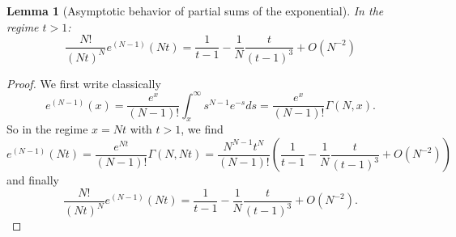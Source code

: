 \documentclass[12pt,a4paper]{amsart}
\theoremstyle{plain} %
\newtheorem{lemma}[theorem]{Lemma}
\begin{document}
\begin{lemma}[Asymptotic behavior of partial sums of the exponential]\label{lemma:asymp_partial_sums}
In the regime $t>1$: 
$$\frac{N!}{(Nt)^N} e^{(N-1)} (Nt) =  \frac{1}{t-1} - \frac{1}{N} \frac{t}{(t-1)^3} + O(N^{-2})$$
\end{lemma}

\begin{proof}
We first write classically 
$$
e^{(N-1)} (x)
= \frac{e^x}{(N-1)!} \int_{x}^{\infty} s^{N-1} e^{-s} d s
= \frac{e^x}{(N-1)!} \Gamma(N,x).
$$
So in the regime $x=Nt$ with $t>1$, we find
$$
e^{(N-1)} (Nt) = \frac{e^{Nt}}{(N-1)!} \Gamma(N,Nt) = \frac{ N^{N-1}t^N }{(N-1)!}   \left( \frac{1}{t-1} - \frac{1}{N} \frac{t}{(t-1)^3} + O(N^{-2})\right)
$$
and finally
$$
\frac{N!}{(Nt)^N} e^{(N-1)} (Nt) =  \frac{1}{t-1} - \frac{1}{N} \frac{t}{(t-1)^3} + O(N^{-2}).
$$

\end{proof}
\end{document}
